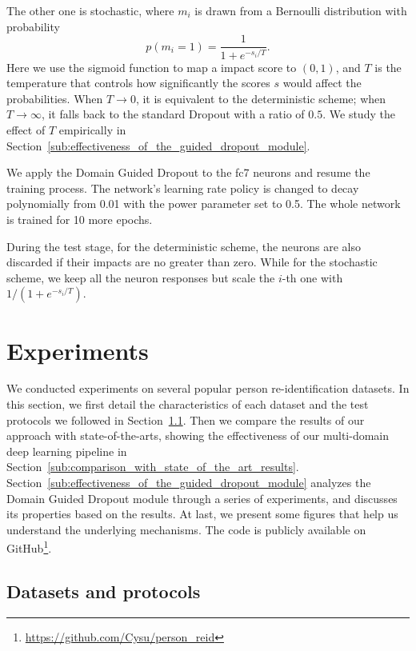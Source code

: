 The other one is stochastic, where $m_i$ is drawn from a Bernoulli distribution with probability
\begin{equation} \label{eq:stochastic_guided_dropout}
   p(m_i=1) = \frac{1}{1+e^{-s_i/T}}.
\end{equation}
Here we use the sigmoid function to map a impact score to $(0,1)$, and $T$ is the temperature that controls how significantly the scores $s$ would affect the probabilities. When $T\to 0$, it is equivalent to the deterministic scheme; when $T\to \infty$, it falls back to the standard Dropout with a ratio of $0.5$. We study the effect of $T$ empirically in Section~\ref{sub:effectiveness_of_the_guided_dropout_module}.

We apply the Domain Guided Dropout to the fc7 neurons and resume the training process. The network's learning rate policy is changed to decay polynomially from 0.01 with the power parameter set to 0.5. The whole network is trained for 10 more epochs.

During the test stage, for the deterministic scheme, the neurons are also discarded if their impacts are no greater than zero. While for the stochastic scheme, we keep all the neuron responses but scale the $i$-th one with $1/(1+e^{-s_i/T})$.




\section{Experiments} %
\label{sec:experiments}

We conducted experiments on several popular person re-identification datasets. In this section, we first detail the characteristics of each dataset and the test protocols we followed in Section~\ref{sub:datasets_and_protocols}. Then we compare the results of our approach with state-of-the-arts, showing the effectiveness of our multi-domain deep learning pipeline in Section~\ref{sub:comparison_with_state_of_the_art_results}. Section~\ref{sub:effectiveness_of_the_guided_dropout_module} analyzes the Domain Guided Dropout module through a series of experiments, and discusses its properties based on the results. At last, we present some figures that help us understand the underlying mechanisms. The code is publicly available on GitHub\footnote{\url{https://github.com/Cysu/person_reid}}.

\subsection{Datasets and protocols} %
\label{sub:datasets_and_protocols}

